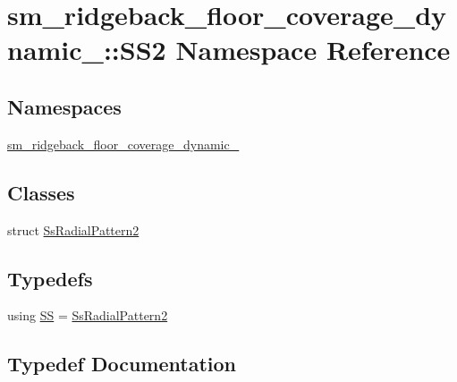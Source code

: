 \hypertarget{namespacesm__ridgeback__floor__coverage__dynamic__1_1_1SS2}{}\section{sm\+\_\+ridgeback\+\_\+floor\+\_\+coverage\+\_\+dynamic\+\_\+:\+:S\+S2 Namespace Reference}
\label{namespacesm__ridgeback__floor__coverage__dynamic__1_1_1SS2}
\subsection*{Namespaces}
\begin{DoxyCompactItemize}
\item 
 \hyperlink{namespacesm__ridgeback__floor__coverage__dynamic__1_1_1SS2_1_1sm__ridgeback__floor__coverage__dynamic__1}{sm\+\_\+ridgeback\+\_\+floor\+\_\+coverage\+\_\+dynamic\+\_}
\end{DoxyCompactItemize}
\subsection*{Classes}
\begin{DoxyCompactItemize}
\item 
struct \hyperlink{structsm__ridgeback__floor__coverage__dynamic__1_1_1SS2_1_1SsRadialPattern2}{Ss\+Radial\+Pattern2}
\end{DoxyCompactItemize}
\subsection*{Typedefs}
\begin{DoxyCompactItemize}
\item 
using \hyperlink{namespacesm__ridgeback__floor__coverage__dynamic__1_1_1SS2_a4708dfdbe1e5e300cce2284bd8151560}{SS} = \hyperlink{structsm__ridgeback__floor__coverage__dynamic__1_1_1SS2_1_1SsRadialPattern2}{Ss\+Radial\+Pattern2}
\end{DoxyCompactItemize}


\subsection{Typedef Documentation}
\mbox{\label{namespacesm__ridgeback__floor__coverage__dynamic__1_1_1SS2_a4708dfdbe1e5e300cce2284bd8151560}} 
